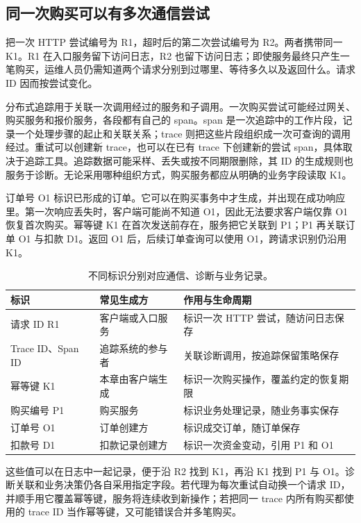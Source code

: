 \subsection*{同一次购买可以有多次通信尝试}

把一次 HTTP 尝试编号为 R1，超时后的第二次尝试编号为 R2。两者携带同一 K1。R1 在入口服务留下访问日志，R2 也留下访问日志；即使服务最终只产生一笔购买，运维人员仍需知道两个请求分别到过哪里、等待多久以及返回什么。请求 ID 因而按尝试变化。

分布式追踪用于关联一次调用经过的服务和子调用。一次购买尝试可能经过网关、购买服务和报价服务，各段都有自己的 span。span 是一次追踪中的工作片段，记录一个处理步骤的起止和关联关系；trace 则把这些片段组织成一次可查询的调用经过。重试可以创建新 trace，也可以在已有 trace 下创建新的尝试 span，具体取决于追踪工具。追踪数据可能采样、丢失或按不同期限删除，其 ID 的生成规则也服务于诊断。无论采用哪种组织方式，购买服务都应从明确的业务字段读取 K1。

订单号 O1 标识已形成的订单。它可以在购买事务中才生成，并出现在成功响应里。第一次响应丢失时，客户端可能尚不知道 O1，因此无法要求客户端仅靠 O1 恢复首次购买。幂等键 K1 在首次发送前存在，服务把它关联到 P1；P1 再关联订单 O1 与扣款 D1。返回 O1 后，后续订单查询可以使用 O1，跨请求识别仍沿用 K1。



\begin{table}[htbp]
\centering\small
\begin{tabularx}{\linewidth}{@{}p{3.1cm}p{3.1cm}X@{}}
\toprule
标识 & 常见生成方 & 作用与生命周期\\
\midrule
请求 ID R1 & 客户端或入口服务 & 标识一次 HTTP 尝试，随访问日志保存\\
Trace ID、Span ID & 追踪系统的参与者 & 关联诊断调用，按追踪保留策略保存\\
幂等键 K1 & 本章由客户端生成 & 标识一次购买操作，覆盖约定的恢复期限\\
购买编号 P1 & 购买服务 & 标识业务处理记录，随业务事实保存\\
订单号 O1 & 订单创建方 & 标识成交订单，随订单保存\\
扣款号 D1 & 扣款记录创建方 & 标识一次资金变动，引用 P1 和 O1\\
\bottomrule
\end{tabularx}
\caption{不同标识分别对应通信、诊断与业务记录。}
\end{table}

这些值可以在日志中一起记录，便于沿 R2 找到 K1，再沿 K1 找到 P1 与 O1。诊断关联和业务决策仍各自采用指定字段。若代理为每次重试自动换一个请求 ID，并顺手用它覆盖幂等键，服务将连续收到新操作；若把同一 trace 内所有购买都使用的 trace ID 当作幂等键，又可能错误合并多笔购买。

